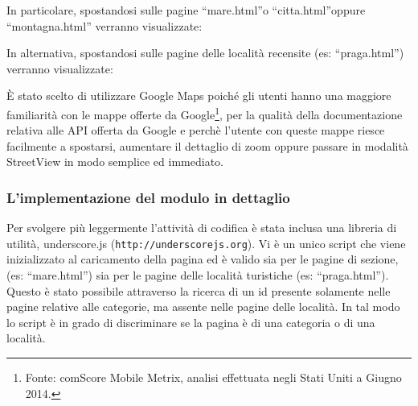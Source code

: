 \begin{flushleft}
In particolare, spostandosi sulle pagine “mare.html”o “citta.html”oppure “montagna.html” verranno visualizzate:
\end{flushleft}
\begin{flushleft}
In alternativa, spostandosi sulle pagine delle località recensite (es: “praga.html”) verranno visualizzate:
\end{flushleft}
È stato scelto di utilizzare Google Maps poiché gli utenti hanno una maggiore
familiarità con le mappe offerte da Google\footnote{ Fonte: comScore Mobile
Metrix, analisi effettuata negli Stati Uniti a Giugno 2014.}, per la qualità
della documentazione relativa alle API offerta da Google e perchè l'utente con
queste mappe riesce facilmente a spostarsi, aumentare il dettaglio di zoom
oppure passare in modalità StreetView in modo semplice ed immediato.

\subsubsection{L'implementazione del modulo in dettaglio}

Per svolgere più leggermente l'attività di codifica è stata inclusa una libreria di utilità, underscore.js (\texttt{http://underscorejs.org}).
Vi è un unico script che viene inizializzato al caricamento della pagina ed è valido sia per le pagine di sezione, (es: “mare.html”) sia per le pagine delle località turistiche (es: “praga.html”).
Questo è stato possibile attraverso la ricerca di un id presente solamente nelle pagine relative alle categorie, ma assente nelle pagine delle località. In tal modo lo script è in grado di discriminare se la pagina è di una categoria o di una località.


